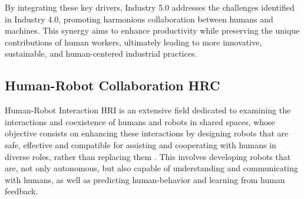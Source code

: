 By integrating these key drivers, Industry 5.0 addresses the challenges identified in Industry 4.0, promoting harmonious collaboration between humans and machines. This synergy aims to enhance productivity while preserving the unique contributions of human workers, ultimately leading to more innovative, sustainable, and human-centered industrial practices.





\subsection{Human-Robot Collaboration \ac{HRC}}
\label{subsection:human-robot-collab}
% 

Human-Robot Interaction \ac{HRI} is an extensive field dedicated to examining the interactions and coexistence of humans and robots in shared spaces, whose objective consists on enhancing these interactions by designing robots that are safe, effective and compatible for assisting and cooperating with humans in diverse roles, rather than replacing them \cite{Ogenyi2021}.
This involves developing robots that are, not only autonomous, but also capable of understanding and communicating with humans, as well as predicting
human-behavior and learning from human feedback. 

